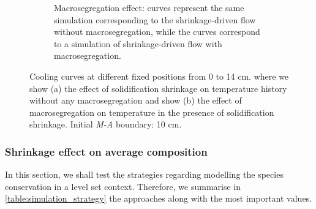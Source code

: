 \begin{figure}[htbp]
\begin{subfigure}[t]{0.8\textwidth}
	\caption{Macrosegregation effect:  curves represent the same simulation corresponding to the shrinkage-driven flow without macrosegregation, while
	the  curves correspond to a simulation of shrinkage-driven flow with macrosegregation.}
    \label{fig:macro_effect}
  \end{subfigure}
\caption{Cooling curves at different fixed positions from 0 to 14 cm. 
where we show (a) the effect of solidification shrinkage on temperature history without any macrosegregation and
show (b) the effect of macrosegregation on temperature in the presence of solidification shrinkage.
Initial \emph{M-A} boundary: 10 cm.} 
\label{fig:1dalsi7_macro_shrinkage}
\end{figure}


\subsubsection{Shrinkage effect on average composition}

In this section, we shall test the strategies regarding modelling the species conservation in a level set context.
Therefore, we summarise in \cref{table:simulation_strategy} the approaches along with the most important values.

\begin{table}[H]
\centering
\caption{Summary of simulation configurations that are performed showing the different modelling strategies to account for metallic species transport
in the air domain: monolithic strategy with low species diffusion in the air (MD), monolithic strategy with low species diffusion and advection in the air (MDA)
and non monolithic strategy with composition reinitialisation in the air (NM).}
\label{table:simulation_strategy}
\end{table}


